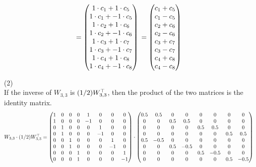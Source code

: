 \documentclass[12pt]{article}
\begin{document}
\[
= 
\begin{pmatrix}
1 \cdot c_1 + 1 \cdot c_5 \\
1 \cdot c_1 + -1 \cdot c_5 \\
1 \cdot c_2 + 1 \cdot c_6 \\
1 \cdot c_2 + -1 \cdot c_6\\
1 \cdot c_3 + 1 \cdot c_7 \\
1 \cdot c_3 + - 1 \cdot c_7 \\
1 \cdot c_4 + 1 \cdot c_8 \\
1 \cdot c_4 + -1 \cdot c_8 \\
\end{pmatrix}
\\ 
= 
\begin{pmatrix}
c_1 + c_5 \\
c_1 - c_5 \\
c_2 + c_6 \\
c_2 - c_6\\
c_3 + c_7 \\
c_3 - c_7 \\
c_4 + c_8 \\
c_4 - c_8 \\
\end{pmatrix}
\]

\medskip
(2) \\
If the inverse of $W_{3, 3}$ is $(1/2) W_{3, 3}^{\top}$, then the product of the two matrices is the identity matrix. 
\[
W_{3, 3} \cdot (1/2) W_{3, 3}^{\top}=
\begin{pmatrix}
1  &  0  &  0 & 0 & 1   &  0   & 0    & 0  \\
1  &  0  &  0 & 0 & -1 &  0   & 0    & 0  \\
0   &  1  &  0 & 0 &  0  & 1   & 0    & 0  \\
0   &  1  &  0 & 0 &  0  & -1 & 0    & 0  \\
0   &  0  &  1 & 0 &  0  &  0  & 1    & 0  \\
0   &  0  &  1 & 0 &  0  &  0  & -1  & 0  \\
0   &  0  &  0 & 1 &  0  &  0  & 0    & 1  \\
0   &  0  &  0 & 1 &  0  &  0  & 0    & -1  \\
\end{pmatrix}
\cdot
\begin{pmatrix}
0.5 & 0.5  & 0   & 0    & 0    & 0     & 0    & 0    \\ 
0   & 0    & 0.5 & 0.5  & 0    & 0     & 0    & 0    \\ 
0   & 0    & 0   & 0    & 0.5  & 0.5   & 0    & 0     \\
0   & 0    & 0   & 0    & 0    & 0     & 0.5  & 0.5   \\
0.5 & -0.5 & 0   & 0    & 0    & 0     & 0    & 0     \\
0   & 0    & 0.5 & -0.5 & 0    & 0     & 0    & 0     \\
0   & 0    & 0   & 0    & 0.5  & -0.5  & 0    & 0     \\
0   & 0    & 0   & 0    & 0    & 0     & 0.5  & -0.5  \\
\end{pmatrix}
\] 
\end{document}
